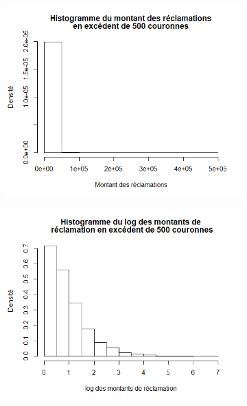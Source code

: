 			\begin{figure}[H]
				\centering
				\begin{subfigure}[b]{0.3\textwidth}
					\includegraphics[scale=0.35]{Graphiques/Hist_SeverNorwegianFire} 
					\caption{} \label{Hist_SeverNorwegianFire}
				\end{subfigure}
				\begin{subfigure}[b]{0.3\textwidth}
					\includegraphics[scale=0.35]{Graphiques/Hist_SevNorwegianFire2}
					\caption{} \label{Hist_SevNorwegianFire2}
				\end{subfigure}
				\begin{subfigure}[b]{0.3\textwidth}

\end{subfigure}
\end{figure}
